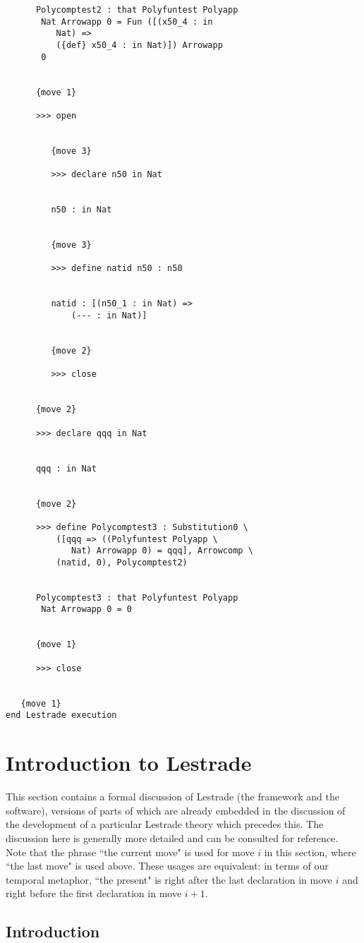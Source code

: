 \documentclass[12pt]{article}
\begin{document}
\begin{verbatim}
      Polycomptest2 : that Polyfuntest Polyapp 
       Nat Arrowapp 0 = Fun ([(x50_4 : in 
          Nat) => 
          ({def} x50_4 : in Nat)]) Arrowapp 
       0


      {move 1}

      >>> open


         {move 3}

         >>> declare n50 in Nat


         n50 : in Nat


         {move 3}

         >>> define natid n50 : n50


         natid : [(n50_1 : in Nat) => 
             (--- : in Nat)]


         {move 2}

         >>> close


      {move 2}

      >>> declare qqq in Nat


      qqq : in Nat


      {move 2}

      >>> define Polycomptest3 : Substitution0 \
          ([qqq => ((Polyfuntest Polyapp \
             Nat) Arrowapp 0) = qqq], Arrowcomp \
          (natid, 0), Polycomptest2)


      Polycomptest3 : that Polyfuntest Polyapp 
       Nat Arrowapp 0 = 0


      {move 1}

      >>> close


   {move 1}
end Lestrade execution
\end{verbatim}


\section{Introduction to Lestrade}

This section contains a formal discussion of Lestrade (the framework and the software), versions of parts of which are already embedded in the discussion of the development of a particular Lestrade theory which precedes this.  The discussion here is generally more detailed and can be consulted for reference.  Note that the phrase ``the current move" is used for move $i$ in this section, where ``the last move" is used above.  These usages are equivalent:  in terms of our temporal metaphor, ``the present" is right after the last declaration in move $i$ and right before the first declaration in move $i+1$.

\subsection{Introduction}
\end{document}
